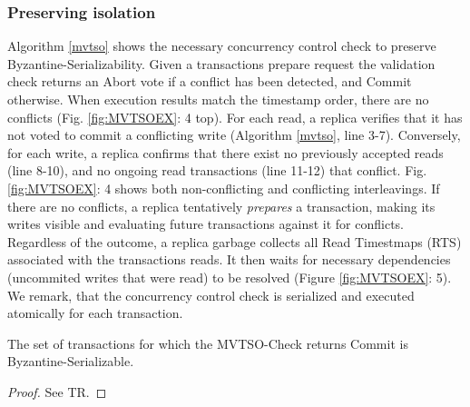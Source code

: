 
\subsubsection{Preserving isolation}

Algorithm \ref{mvtso} shows the necessary concurrency control check to preserve Byzantine-Serializability. 
Given a transactions prepare request the validation check returns an Abort vote if a conflict has been detected, and Commit otherwise. 
When execution results match the timestamp order, there are no conflicts (Fig. \ref{fig:MVTSOEX}: 4 top). For each read, a replica verifies that it has not voted to commit a conflicting write (Algorithm \ref{mvtso}, line 3-7). Conversely, for each write, a replica confirms that there exist no previously accepted reads (line 8-10), and no ongoing read transactions (line 11-12) that conflict. Fig. \ref{fig:MVTSOEX}: 4 shows both non-conflicting and conflicting interleavings.
If there are no conflicts, a replica tentatively \textit{prepares} a transaction, making its writes visible and evaluating future transactions against it for conflicts. Regardless of the outcome, a replica garbage collects all Read Timestmaps (RTS) associated with the transactions reads.
It then waits for necessary dependencies (uncommited writes that were read) to be resolved (Figure \ref{fig:MVTSOEX}: 5). We remark, that the concurrency control check is serialized and executed atomically for each transaction.

\begin{theorem}
The set of transactions for which the MVTSO-Check returns Commit is Byzantine-Serializable. 
\end{theorem}
\begin{proof}
See TR. 
\end{proof}

